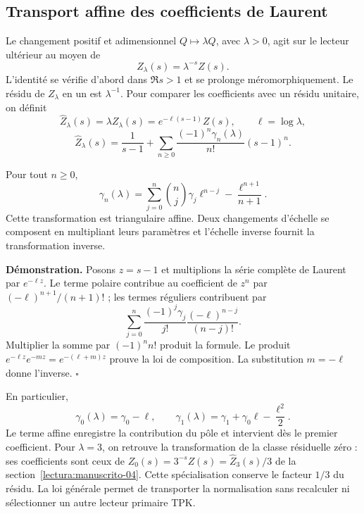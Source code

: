 \subsection{Transport affine des coefficients de Laurent}
\label{ix-add:stieltjes}

Le changement positif et adimensionnel $Q\mapsto\lambda Q$, avec
$\lambda>0$, agit sur le lecteur ultérieur au moyen de
\[
 Z_\lambda(s)=\lambda^{-s}Z(s).
\]
L'identité se vérifie d'abord dans $\Re s>1$ et se prolonge
méromorphiquement. Le résidu de $Z_\lambda$ en un est $\lambda^{-1}$.
Pour comparer les coefficients avec un résidu unitaire, on définit
\[
 \widehat Z_\lambda(s)=\lambda Z_\lambda(s)
 =e^{-\ell(s-1)}Z(s),\qquad \ell=\log\lambda,
\]
\[
 \widehat Z_\lambda(s)=\frac1{s-1}
 +\sum_{n\geq0}\frac{(-1)^n\gamma_n(\lambda)}{n!}(s-1)^n.
\]

Pour tout $n\geq0$,
\[
 \gamma_n(\lambda)=
 \sum_{j=0}^{n}\binom nj\gamma_j\ell^{n-j}
 -\frac{\ell^{n+1}}{n+1}.
\]
Cette transformation est triangulaire affine. Deux changements d'échelle se composent en multipliant leurs paramètres et l'échelle inverse fournit la transformation inverse.

\textbf{Démonstration.} Posons $z=s-1$ et multiplions la série
complète de Laurent par $e^{-\ell z}$. Le terme polaire contribue au
coefficient de $z^n$ par $(-\ell)^{n+1}/(n+1)!$ ; les termes réguliers
contribuent par
\[
 \sum_{j=0}^n\frac{(-1)^j\gamma_j}{j!}
                    \frac{(-\ell)^{n-j}}{(n-j)!}.
\]
Multiplier la somme par $(-1)^nn!$ produit la formule. Le produit
$e^{-\ell z}e^{-mz}=e^{-(\ell+m)z}$ prouve la loi de composition.
La substitution $m=-\ell$ donne l'inverse. \hfill$\square$

En particulier,
\[
 \gamma_0(\lambda)=\gamma_0-\ell,\qquad
 \gamma_1(\lambda)=\gamma_1+\gamma_0\ell-\frac{\ell^2}{2}.
\]
Le terme affine enregistre la contribution du pôle et intervient dès le premier coefficient. Pour $\lambda=3$, on retrouve la transformation de la classe résiduelle zéro : ses coefficients sont ceux de $Z_0(s)=3^{-s}Z(s)=\widehat Z_3(s)/3$ de la section~\ref{lectura:manuscrito-04}. Cette spécialisation conserve le facteur $1/3$ du résidu. La loi générale permet de transporter la normalisation sans recalculer ni sélectionner un autre lecteur primaire TPK.
